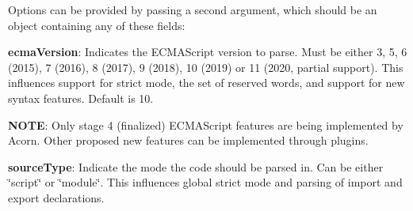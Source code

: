 Options can be provided by passing a second argument, which should be an object containing any of these fields\+:


\begin{DoxyItemize}
\item {\bfseries ecma\+Version}\+: Indicates the E\+C\+M\+A\+Script version to parse. Must be either 3, 5, 6 (2015), 7 (2016), 8 (2017), 9 (2018), 10 (2019) or 11 (2020, partial support). This influences support for strict mode, the set of reserved words, and support for new syntax features. Default is 10.

{\bfseries N\+O\+TE}\+: Only \textquotesingle{}stage 4\textquotesingle{} (finalized) E\+C\+M\+A\+Script features are being implemented by Acorn. Other proposed new features can be implemented through plugins.
\item {\bfseries source\+Type}\+: Indicate the mode the code should be parsed in. Can be either {\ttfamily \char`\"{}script\char`\"{}} or {\ttfamily \char`\"{}module\char`\"{}}. This influences global strict mode and parsing of {\ttfamily import} and {\ttfamily export} declarations.


\end{DoxyItemize}
